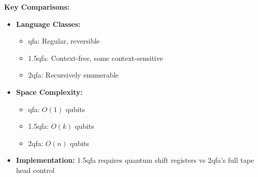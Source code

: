\textbf{Key Comparisons:}
\begin{itemize}
    \item \textbf{Language Classes:}
    \begin{itemize}
        \item \gls{qfa}: Regular, reversible
        \item \gls{1.5qfa}: Context-free, some context-sensitive
        \item \gls{2qfa}: Recursively enumerable
    \end{itemize}
    \item \textbf{Space Complexity:}
    \begin{itemize}
        \item \gls{qfa}: $O(1)$ qubits
        \item \gls{1.5qfa}: $O(k)$ qubits
        \item \gls{2qfa}: $O(n)$ qubits
    \end{itemize}
    \item \textbf{Implementation:} \gls{1.5qfa} requires quantum shift registers vs \gls{2qfa}'s full tape head control
\end{itemize}